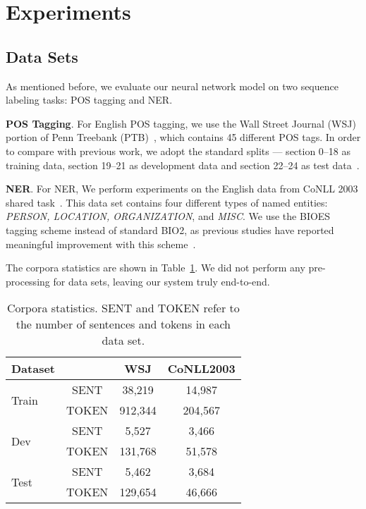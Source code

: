 \documentclass[11pt]{article}
\begin{document}
\section{Experiments}
\subsection{Data Sets}
As mentioned before, we evaluate our neural network model on two sequence labeling tasks: POS tagging and NER.

\noindent
\textbf{POS Tagging}. For English POS tagging, we use the Wall Street Journal (WSJ) portion of Penn Treebank (PTB)~\cite{Marcus:1993}, which contains 45 different POS tags. In order to compare with previous work, we adopt the standard splits --- section 0--18 as training data, section 19--21 as development data and section 22--24 as test data~\cite{manning2011part,sogaard:2011:ACL-HLT20111}.

\noindent
\textbf{NER}. For NER, We perform experiments on the English data from CoNLL 2003 shared task~\cite{TjongKimSang:2003}. This data set contains four different types of named entities: \emph{PERSON, LOCATION, ORGANIZATION}, and \emph{MISC}. We use the \textsf{BIOES} tagging scheme instead of standard \textsf{BIO2}, as previous studies have reported meaningful improvement with this scheme~\cite{ratinov2009design,dai2015enhancing,lample:2016:NAACL}.

The corpora statistics are shown in Table~\ref{tab:corpus}. We did not perform any pre-processing for data sets, leaving our system truly end-to-end.

\begin{table}
\centering
\begin{tabular}[t]{l|c|c|c}
\hline
\textbf{Dataset} & & \textbf{WSJ} & \textbf{CoNLL2003} \\
\hline
\multirow{2}{*}{Train} & SENT & 38,219 & 14,987\\
 & TOKEN & 912,344 & 204,567 \\
\hline
\multirow{2}{*}{Dev} & SENT & 5,527 & 3,466 \\
 & TOKEN & 131,768 & 51,578 \\
\hline
\multirow{2}{*}{Test} & SENT & 5,462 & 3,684 \\
 & TOKEN & 129,654 & 46,666 \\
\hline
\end{tabular}
\caption{Corpora statistics. SENT and TOKEN refer to the number of sentences and tokens in each data set.}
\label{tab:corpus}
\end{table}
\end{document}
